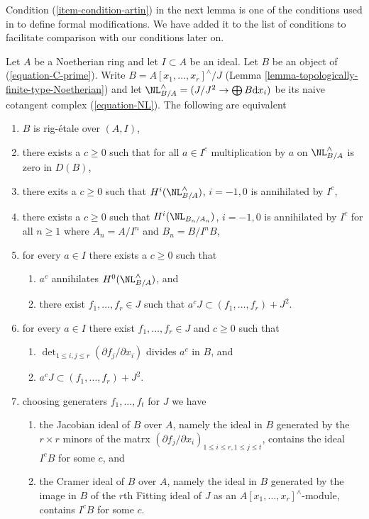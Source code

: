 \noindent
Condition (\ref{item-condition-artin}) in the next lemma is
one of the conditions used in \cite{ArtinII} to define formal modifications.
We have added it to the list of conditions to facilitate comparison
with our conditions later on.

\begin{lemma}
\label{lemma-equivalent-with-artin}
Let $A$ be a Noetherian ring and let $I \subset A$ be an ideal.
Let $B$ be an object of (\ref{equation-C-prime}). Write
$B = A[x_1, \ldots, x_r]^\wedge/J$
(Lemma \ref{lemma-topologically-finite-type-Noetherian})
and let $\NL_{B/A}^\wedge = (J/J^2 \to \bigoplus B\text{d}x_i)$
be its naive cotangent complex (\ref{equation-NL}).
The following are equivalent
\begin{enumerate}
\item $B$ is rig-\'etale over $(A, I)$,
\item
\label{item-zero-on-NL}
there exists a $c \geq 0$ such that for all $a \in I^c$ multiplication by $a$
on $\NL_{B/A}^\wedge$ is zero in $D(B)$,
\item
\label{item-zero-on-cohomology-NL}
there exits a $c \geq 0$ such that $H^i(\NL_{B/A}^\wedge)$, $i = -1, 0$ is
annihilated by $I^c$,
\item
\label{item-zero-on-cohomology-NL-truncations}
there exists a $c \geq 0$ such that $H^i(\NL_{B_n/A_n})$, $i = -1, 0$ is
annihilated by $I^c$ for all $n \geq 1$ where $A_n = A/I^n$ and $B_n = B/I^nB$,
\item
\label{item-condition-artin-pre-pre}
for every $a \in I$ there exists a $c \geq 0$ such that
\begin{enumerate}
\item $a^c$ annihilates $H^0(\NL_{B/A}^\wedge)$, and
\item there exist $f_1, \ldots, f_r \in J$ such that
$a^c J \subset (f_1, \ldots, f_r) + J^2$.
\end{enumerate}
\item
\label{item-condition-artin-pre}
for every $a \in I$ there exist $f_1, \ldots, f_r \in J$ and $c \geq 0$
such that
\begin{enumerate}
\item $\det_{1 \leq i, j \leq r}(\partial f_j/\partial x_i)$ divides
$a^c$ in $B$, and
\item $a^c J \subset (f_1, \ldots, f_r) + J^2$.
\end{enumerate}
\item
\label{item-condition-artin}
choosing generaters $f_1, \ldots, f_t$ for $J$ we have
\begin{enumerate}
\item the Jacobian ideal of $B$ over $A$, namely the ideal in $B$
generated by the $r \times r$ minors of the matrx
$(\partial f_j/\partial x_i)_{1 \leq i \leq r, 1 \leq j \leq t}$,
contains the ideal $I^cB$ for some $c$, and
\item the Cramer ideal of $B$ over $A$, namely the ideal in $B$
generated by the image in $B$ of the $r$th Fitting ideal of $J$
as an $A[x_1, \ldots, x_r]^\wedge$-module, contains $I^cB$ for some $c$.
\end{enumerate}
\end{enumerate}
\end{lemma}

